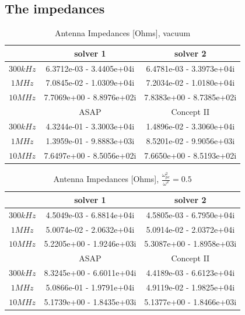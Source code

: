 \documentclass[two-coloumn,ras]{agutex}
\begin{document}
\begin{article}
\subsection{The impedances}
\begin{table}
\caption{Antenna Impedances [Ohms], vacuum}
\label{tab:impedances_vacuum}
\begin{tabular}{|c|c|c|}
 \hline
 & solver 1  & solver 2  \\
\hline
$300 kHz$ & 6.3712e-03 - 3.4405e+04i &  6.4781e-03 - 3.3973e+04i \\
$1 MHz$ & 7.0845e-02 - 1.0309e+04i &  7.2034e-02 - 1.0180e+04i \\
$10 MHz$ &  7.7069e+00 - 8.8976e+02i&  7.8383e+00 - 8.7385e+02i\\
\hline
& ASAP  & Concept II\\
\hline
$300 kHz$ &  4.3244e-01 - 3.3003e+04i &  1.4896e-02 - 3.3060e+04i\\
$1 MHz$ & 1.3959e-01 - 9.8883e+03i &  8.5201e-02 - 9.9056e+03i\\
$10 MHz$ &    7.6497e+00 - 8.5056e+02i&  7.6650e+00 - 8.5193e+02i\\
\hline
\end{tabular}
\end{table}




\begin{table}
\caption{Antenna Impedances [Ohms], $\frac{\omega_{pe}^2}{\omega^2}=0.5$}
\label{tab:impedances_plasma}
\begin{tabular}{|c|c|c|}
 \hline
 & solver 1  & solver 2  \\
\hline
$300 kHz$ & 4.5049e-03 - 6.8814e+04i & 4.5805e-03 - 6.7950e+04i  \\
$1 MHz$ &  5.0074e-02 - 2.0632e+04i &  5.0914e-02 - 2.0372e+04i \\
$10 MHz$ & 5.2205e+00 - 1.9246e+03i &  5.3087e+00 - 1.8958e+03i \\
\hline
& ASAP  & Concept II  \\
\hline
$300 kHz$ & 8.3245e+00 - 6.6011e+04i &  4.4189e-03 - 6.6123e+04i \\
$1 MHz$ & 5.0866e-01 - 1.9791e+04i &  4.9119e-02 - 1.9825e+04i \\
$10 MHz$ &  5.1739e+00 - 1.8435e+03i&  5.1377e+00 - 1.8466e+03i \\
\hline
\end{tabular}
\end{table}


\end{article}
\end{document}
